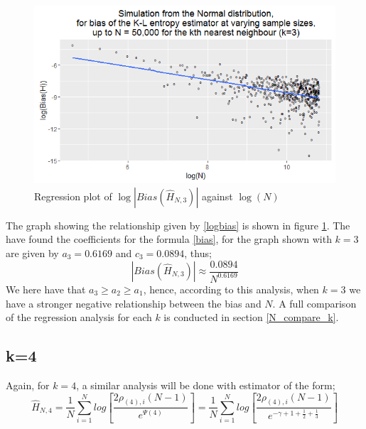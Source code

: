 \documentclass{report}
\begin{document}
\begin{figure}
  \begin{center}
    \includegraphics[width=\textwidth]{./Graphs/new_normal_k=3.png}
  \end{center}
\caption{Regression plot of $\log|Bias(\hat{H}_{N, 3})|$ against $\log(N)$}
  \label{normal_k=3_graph}
\end{figure}

The graph showing the relationship given by \ref{logbias} is shown in figure \ref{normal_k=3_graph}. The have found the coefficients for the formula \ref{bias}, for the graph shown with $k=3$ are given by $a_{3} = 0.6169$ and $c_{3} = 0.0894$, thus;
\begin{equation}
|Bias(\hat{H}_{N, 3})| \approx \frac{0.0894}{N^{0.6169}} \nonumber
\end{equation}
 We here have that $a_{3} \geq a_{2} \geq a_{1}$, hence, according to this analysis, when $k=3$ we have a stronger negative relationship between the bias and $N$. A full comparison of the regression analysis for each $k$ is conducted in section \ref{N_compare_k}.





\subsection{k=4} \label{N_k=4}
Again, for $k=4$, a similar analysis will be done with estimator of the form;
\begin{equation}
\hat{H}_{N, 4} = \frac{1}{N} \sum_{i=1}^{N} log \left[ \frac{2\rho_{(4),i} (N-1)}{e^{\Psi(4)}} \right] = \frac{1}{N} \sum_{i=1}^{N} log \left[ \frac{2\rho_{(4),i} (N-1)}{e^{-\gamma + 1 + \frac{1}{2} + \frac{1}{3}}} \right] \nonumber
\end{equation}
\end{document}
